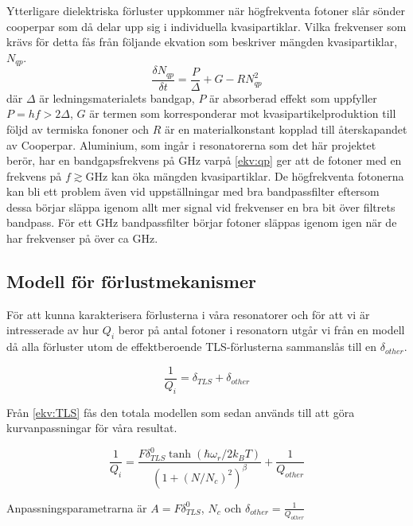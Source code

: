 \documentclass[main.tex]{subfiles}
\begin{document}
Ytterligare dielektriska förluster uppkommer när högfrekventa fotoner slår sönder cooperpar som då delar upp sig i individuella kvasipartiklar. Vilka frekvenser som krävs för detta fås från följande ekvation som beskriver mängden kvasipartiklar, $N_{qp}$.
\begin{equation}
\label{ekv_qp}
    \frac{\delta N_{qp}}{\delta t}=\frac{P}{\Delta}+G-RN_{qp}^2
\end{equation}
där $\Delta$ är ledningsmaterialets bandgap, $P$ är absorberad effekt som uppfyller $P=hf>2\Delta$, $G$ är termen som korresponderar mot kvasipartikelproduktion till följd av termiska fononer och $R$ är en materialkonstant kopplad till återskapandet av Cooperpar\cite{Barends2011}. Aluminium, som ingår i resonatorerna som det här projektet berör, har en bandgapsfrekvens på \unit[88]{GHz} varpå \ref{ekv:qp} ger att de fotoner med en frekvens på $f\gtrsim$\unit[180]{GHz} kan öka mängden kvasipartiklar.
De högfrekventa fotonerna kan bli ett problem även vid uppställningar med bra bandpassfilter eftersom dessa börjar släppa igenom allt mer signal vid frekvenser en bra bit över filtrets bandpass\cite{santavicca2008}. För ett \unit[4-8]{GHz} bandpassfilter börjar fotoner släppas igenom igen när de har frekvenser på över ca \unit[20]{GHz}.

\subsection{Modell för förlustmekanismer}
För att kunna karakterisera förlusterna i våra resonatorer och för att vi är intresserade av hur $Q_i$ beror på antal fotoner i resonatorn utgår vi från en modell då alla förluster utom de effektberoende TLS-förlusterna sammanslås till en $\delta_{other}$.

\begin{equation*}
    \frac{1}{Q_i}=\delta_{TLS}+\delta_{other}
\end{equation*}
\noindent

Från \ref{ekv:TLS} fås den totala modellen som sedan används till att göra kurvanpassningar för våra resultat.

\begin{equation}
    \label{ekv:TLSmodel}
    \frac{1}{Q_i}=\frac{F\delta_{TLS}^0\tanh{(\hbar\omega_r/2k_BT)}}{(1+(N/N_c)^2)^\beta}+\frac{1}{Q_{other}}
\end{equation}

Anpassningsparametrarna är $A=F\delta_{TLS}^0$, $N_c$ och $\delta_{other}=\frac{1}{Q_{other}}$
\end{document}
